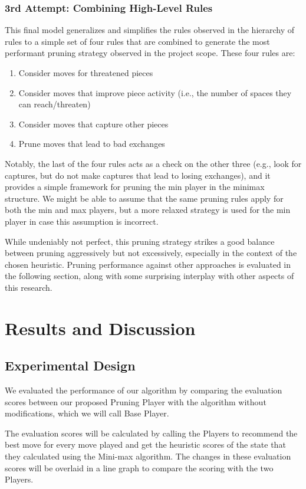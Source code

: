 \documentclass[letterpaper]{article}
\begin{document}
\subsubsection{3rd Attempt: Combining High-Level Rules}
This final model generalizes and simplifies the rules observed in the hierarchy of rules to a simple set of four rules that are combined to generate the most performant pruning strategy observed in the project scope.  These four rules are:
\begin{enumerate}
    \item Consider moves for threatened pieces
    \item Consider moves that improve piece activity (i.e., the number of spaces they can reach/threaten)
    \item Consider moves that capture other pieces
    \item Prune moves that lead to bad exchanges
\end{enumerate}
Notably, the last of the four rules acts as a check on the other three (e.g., look for captures, but do not make captures that lead to losing exchanges), and it provides a simple framework for pruning the min player in the minimax structure.  We might be able to assume that the same pruning rules apply for both the min and max players, but a more relaxed strategy is used for the min player in case this assumption is incorrect.

While undeniably not perfect, this pruning strategy strikes a good balance between pruning aggressively but not excessively, especially in the context of the chosen heuristic.  Pruning performance against other approaches is evaluated in the following section, along with some surprising interplay with other aspects of this research.

\section{Results and Discussion}
\subsection{Experimental Design}
We evaluated the performance of our algorithm by comparing the evaluation scores between our proposed Pruning Player with the algorithm without modifications, which we will call Base Player.

The evaluation scores will be calculated by calling the Players to recommend the best move for every move played and get the heuristic scores of the state that they calculated using the Mini-max algorithm. The changes in these evaluation scores will be overlaid in a line graph to compare the scoring with the two Players.
\end{document}
